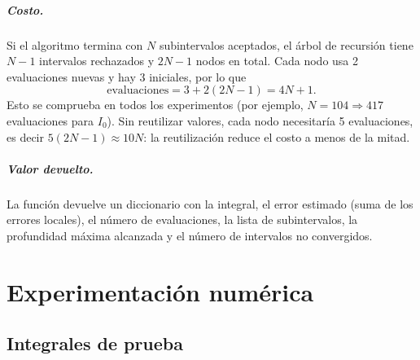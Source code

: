 \documentclass[11pt,letterpaper]{report}
\begin{document}
\paragraph{Costo.} Si el algoritmo termina con $N$ subintervalos aceptados, el árbol de
recursión tiene $N-1$ intervalos rechazados y $2N-1$ nodos en total. Cada nodo usa 2
evaluaciones nuevas y hay 3 iniciales, por lo que
\[
\text{evaluaciones}=3+2(2N-1)=4N+1 .
\]
Esto se comprueba en todos los experimentos (por ejemplo, $N=104\Rightarrow 417$ evaluaciones
para $I_0$). Sin reutilizar valores, cada nodo necesitaría 5 evaluaciones, es decir
$5(2N-1)\approx 10N$: la reutilización reduce el costo a menos de la mitad.

\paragraph{Valor devuelto.} La función devuelve un diccionario con la integral, el error
estimado (suma de los errores locales), el número de evaluaciones, la lista de subintervalos,
la profundidad máxima alcanzada y el número de intervalos no convergidos.

\chapter{Experimentación numérica}

\section{Integrales de prueba}
\begin{table}[H]
\centering
{}
\caption{Integrales estudiadas. $^{*}I_0$ no tiene primitiva elemental: el valor de referencia
se obtuvo con \texttt{scipy.integrate.quad} con tolerancia $10^{-14}$ y coincide con
Simpson adaptativo con $\varepsilon=10^{-10}$ hasta $2\times10^{-13}$.}
\end{table}
\end{document}

